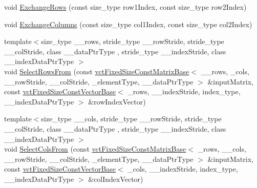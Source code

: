 \begin{DoxyCompactItemize}
\item 
void \hyperlink{classvct_fixed_size_matrix_base_a22e56e73f89499e960858563f70c9f41}{Exchange\+Rows} (const size\+\_\+type row1\+Index, const size\+\_\+type row2\+Index)
\item 
void \hyperlink{classvct_fixed_size_matrix_base_a57e3374f08831aa86879752c8850de7b}{Exchange\+Columns} (const size\+\_\+type col1\+Index, const size\+\_\+type col2\+Index)
\item 
{\footnotesize template$<$size\+\_\+type \+\_\+\+\_\+rows, stride\+\_\+type \+\_\+\+\_\+row\+Stride, stride\+\_\+type \+\_\+\+\_\+col\+Stride, class \+\_\+\+\_\+data\+Ptr\+Type , stride\+\_\+type \+\_\+\+\_\+index\+Stride, class \+\_\+\+\_\+index\+Data\+Ptr\+Type $>$ }\\void \hyperlink{classvct_fixed_size_matrix_base_a03c33204981b48b4221b3ebdb75d1fbc}{Select\+Rows\+From} (const \hyperlink{classvct_fixed_size_const_matrix_base}{vct\+Fixed\+Size\+Const\+Matrix\+Base}$<$ \+\_\+\+\_\+rows, \+\_\+cols, \+\_\+\+\_\+row\+Stride, \+\_\+\+\_\+col\+Stride, \+\_\+element\+Type, \+\_\+\+\_\+data\+Ptr\+Type $>$ \&input\+Matrix, const \hyperlink{classvct_fixed_size_const_vector_base}{vct\+Fixed\+Size\+Const\+Vector\+Base}$<$ \+\_\+rows, \+\_\+\+\_\+index\+Stride, index\+\_\+type, \+\_\+\+\_\+index\+Data\+Ptr\+Type $>$ \&row\+Index\+Vector)
\item 
{\footnotesize template$<$size\+\_\+type \+\_\+\+\_\+cols, stride\+\_\+type \+\_\+\+\_\+row\+Stride, stride\+\_\+type \+\_\+\+\_\+col\+Stride, class \+\_\+\+\_\+data\+Ptr\+Type , stride\+\_\+type \+\_\+\+\_\+index\+Stride, class \+\_\+\+\_\+index\+Data\+Ptr\+Type $>$ }\\void \hyperlink{classvct_fixed_size_matrix_base_a3133cab232f9e3ed511cf47bdc0c0272}{Select\+Cols\+From} (const \hyperlink{classvct_fixed_size_const_matrix_base}{vct\+Fixed\+Size\+Const\+Matrix\+Base}$<$ \+\_\+rows, \+\_\+\+\_\+cols, \+\_\+\+\_\+row\+Stride, \+\_\+\+\_\+col\+Stride, \+\_\+element\+Type, \+\_\+\+\_\+data\+Ptr\+Type $>$ \&input\+Matrix, const \hyperlink{classvct_fixed_size_const_vector_base}{vct\+Fixed\+Size\+Const\+Vector\+Base}$<$ \+\_\+cols, \+\_\+\+\_\+index\+Stride, index\+\_\+type, \+\_\+\+\_\+index\+Data\+Ptr\+Type $>$ \&col\+Index\+Vector)
\end{DoxyCompactItemize}

